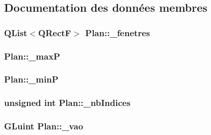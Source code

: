 \subsection{Documentation des données membres}
\hypertarget{class_plan_aa9fdbf8efac3f80ffd8bb2f789e7f4f2}{
\subsubsection[{\+\_\+fenetres}]{\setlength{\rightskip}{0pt plus 5cm}Q\+List$<$Q\+Rect\+F$>$ Plan\+::\+\_\+fenetres\hspace{0.3cm}{\ttfamily [private]}}}\label{class_plan_aa9fdbf8efac3f80ffd8bb2f789e7f4f2}
\hypertarget{class_plan_a2dce54e58d00f40ed8da5c9bd34c1232}{
\subsubsection[{\+\_\+max\+P}]{ Plan\+::\+\_\+max\+P\hspace{0.3cm}{\ttfamily [private]}}}\label{class_plan_a2dce54e58d00f40ed8da5c9bd34c1232}
\hypertarget{class_plan_aad9837a269e87fa5d7a4a5fc90abf3e7}{
\subsubsection[{\+\_\+min\+P}]{ Plan\+::\+\_\+min\+P\hspace{0.3cm}{\ttfamily [private]}}}\label{class_plan_aad9837a269e87fa5d7a4a5fc90abf3e7}
\hypertarget{class_plan_a7f9ccd3bc05e2d3682ecc26326bde71f}{
\subsubsection[{\+\_\+nb\+Indices}]{\setlength{\rightskip}{0pt plus 5cm}unsigned int Plan\+::\+\_\+nb\+Indices\hspace{0.3cm}{\ttfamily [private]}}}\label{class_plan_a7f9ccd3bc05e2d3682ecc26326bde71f}
\hypertarget{class_plan_ab4efe8532b73dd0efca80000afb0027d}{
\subsubsection[{\+\_\+vao}]{\setlength{\rightskip}{0pt plus 5cm}G\+Luint Plan\+::\+\_\+vao\hspace{0.3cm}{\ttfamily [private]}}}\label{class_plan_ab4efe8532b73dd0efca80000afb0027d}
